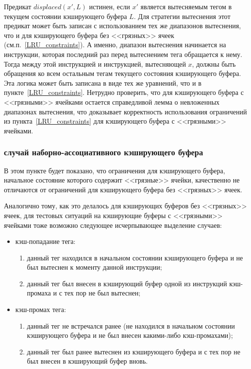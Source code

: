 Предикат $displaced(x', L)$ истинен, если $x'$ является вытесняемым
тегом в текущем состоянии кэширующего буфера $L$. Для стратегии
вытеснения \LRU этот предикат может быть записан с использованием
тех же диапазонов вытеснения, что и для кэширующего буфера без
<<грязных>> ячеек (см.п.~\ref{LRU_constraints}). А именно, диапазон
вытеснения начинается на инструкции, которая последний раз перед
вытеснением тега обращается к нему. Тогда между этой инструкцией и
инструкцией, вытесняющей $x$, должны быть обращения ко всем
остальным тегам текущего состояния кэширующего буфера. Эта логика
может быть записана в виде тех же уравнений, что и в
пункте~\ref{LRU_constraints}. Нетрудно проверить, что для
кэширующего буфера с <<грязными>> ячейками остается справедливой
лемма о невложенных диапазонах вытеснения, что доказывает
корректность использования ограничений из
пункта~\ref{LRU_constraints} для кэширующего буфера с <<грязными>>
ячейками.

\subsubsection{случай наборно-ассоциативного кэширующего буфера}

В этом пункте будет показано, что ограничения для кэширующего
буфера, начальное состояние которого содержит <<грязные>> ячейки,
качественно не отличаются от ограничений для кэширующего буфера без
<<грязных>> ячеек.

Аналогично тому, как это делалось для кэширующих буферов без
<<грязных>> ячеек, для тестовых ситуаций на кэширующие буферы с
<<грязными>> ячейками тоже возможно следующее исчерпывающее
выделение случаев:
\begin{itemize}
\item кэш-попадание тега:
    \begin{enumerate}
    \item данный тег находился в начальном состоянии кэширующего буфера и не был
    вытеснен к моменту данной инструкции;
    \item данный тег был внесен в кэширующий буфер одной из инструкций
    кэш-промаха и с тех пор не был вытеснен;
    \end{enumerate}
\item кэш-промах тега:
    \begin{enumerate}
    \item данный тег не встречался ранее (не находился в начальном
    состоянии кэширующего буфера и не был внесен какими-либо кэш-промахами);
    \item данный тег был ранее вытеснен из кэширующего буфера и с тех пор
    не был внесен в кэширующий буфер вновь.
    \end{enumerate}
\end{itemize}

